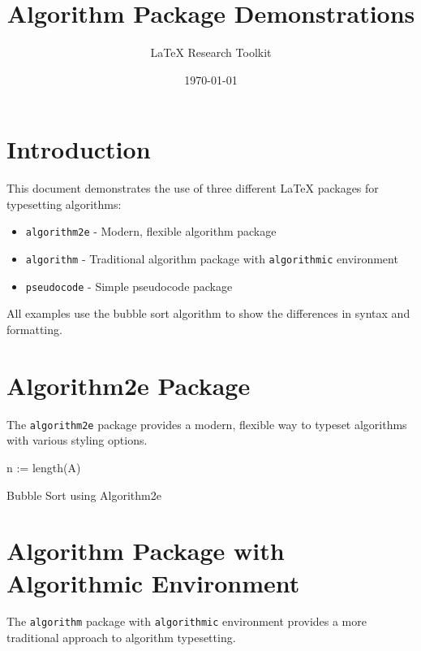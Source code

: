 \documentclass[12pt]{article}
\title{Algorithm Package Demonstrations}
\author{LaTeX Research Toolkit}
\date{\today}
\begin{document}
\maketitle

\section{Introduction}
This document demonstrates the use of three different LaTeX packages for typesetting algorithms:
\begin{itemize}
    \item \texttt{algorithm2e} - Modern, flexible algorithm package
    \item \texttt{algorithm} - Traditional algorithm package with \texttt{algorithmic} environment
    \item \texttt{pseudocode} - Simple pseudocode package
\end{itemize}

All examples use the bubble sort algorithm to show the differences in syntax and formatting.

\section{Algorithm2e Package}

The \texttt{algorithm2e} package provides a modern, flexible way to typeset algorithms with various styling options.

\begin{algorithm}[H]
\SetAlgoLined
{}
\BlankLine
n := length(A)\;
\caption{Bubble Sort using Algorithm2e}
\end{algorithm}

\section{Algorithm Package with Algorithmic Environment}

The \texttt{algorithm} package with \texttt{algorithmic} environment provides a more traditional approach to algorithm typesetting.

\end{document}
